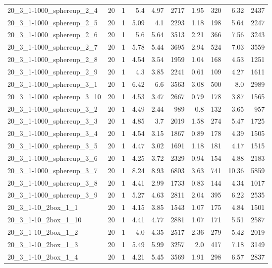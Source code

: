 \begin{center}
\begin{scriptsize}
\begin{longtable}{lrrrrrrrrr}
20\_3\_1-1000\_sphereup\_2\_4 & 20 & 1 & 5.4 & 4.97 & 2717 & 1.95 & 320 & 6.32 & 2437\\
20\_3\_1-1000\_sphereup\_2\_5 & 20 & 1 & 5.09 & 4.1 & 2293 & 1.18 & 198 & 5.64 & 2247\\
20\_3\_1-1000\_sphereup\_2\_6 & 20 & 1 & 5.6 & 5.64 & 3513 & 2.21 & 366 & 7.56 & 3243\\
20\_3\_1-1000\_sphereup\_2\_7 & 20 & 1 & 5.78 & 5.44 & 3695 & 2.94 & 524 & 7.03 & 3559\\
20\_3\_1-1000\_sphereup\_2\_8 & 20 & 1 & 4.54 & 3.54 & 1959 & 1.04 & 168 & 4.53 & 1251\\
20\_3\_1-1000\_sphereup\_2\_9 & 20 & 1 & 4.3 & 3.85 & 2241 & 0.61 & 109 & 4.27 & 1611\\
20\_3\_1-1000\_sphereup\_3\_1 & 20 & 1 & 6.42 & 6.6 & 3563 & 3.08 & 500 & 8.0 & 2989\\
20\_3\_1-1000\_sphereup\_3\_10 & 20 & 1 & 4.53 & 3.47 & 2667 & 0.79 & 178 & 3.87 & 1565\\
20\_3\_1-1000\_sphereup\_3\_2 & 20 & 1 & 4.49 & 2.44 & 989 & 0.8 & 132 & 3.65 & 957\\
20\_3\_1-1000\_sphereup\_3\_3 & 20 & 1 & 4.85 & 3.7 & 2019 & 1.58 & 274 & 5.47 & 1725\\
20\_3\_1-1000\_sphereup\_3\_4 & 20 & 1 & 4.54 & 3.15 & 1867 & 0.89 & 178 & 4.39 & 1505\\
20\_3\_1-1000\_sphereup\_3\_5 & 20 & 1 & 4.47 & 3.02 & 1691 & 1.18 & 181 & 4.17 & 1515\\
20\_3\_1-1000\_sphereup\_3\_6 & 20 & 1 & 4.25 & 3.72 & 2329 & 0.94 & 154 & 4.88 & 2183\\
20\_3\_1-1000\_sphereup\_3\_7 & 20 & 1 & 8.24 & 8.93 & 6803 & 3.63 & 741 & 10.36 & 5859\\
20\_3\_1-1000\_sphereup\_3\_8 & 20 & 1 & 4.41 & 2.99 & 1733 & 0.83 & 144 & 4.34 & 1017\\
20\_3\_1-1000\_sphereup\_3\_9 & 20 & 1 & 5.27 & 4.63 & 2811 & 2.04 & 395 & 6.22 & 2535\\
20\_3\_1-10\_2box\_1\_1 & 20 & 1 & 4.15 & 3.85 & 1543 & 1.07 & 175 & 4.84 & 1501\\
20\_3\_1-10\_2box\_1\_10 & 20 & 1 & 4.41 & 4.77 & 2881 & 1.07 & 171 & 5.51 & 2587\\
20\_3\_1-10\_2box\_1\_2 & 20 & 1 & 4.0 & 4.35 & 2517 & 2.36 & 279 & 5.42 & 2019\\
20\_3\_1-10\_2box\_1\_3 & 20 & 1 & 5.49 & 5.99 & 3257 & 2.0 & 417 & 7.18 & 3149\\
20\_3\_1-10\_2box\_1\_4 & 20 & 1 & 4.21 & 5.45 & 3569 & 1.91 & 298 & 6.57 & 2837\\

\end{longtable}
\end{scriptsize}
\end{center}
